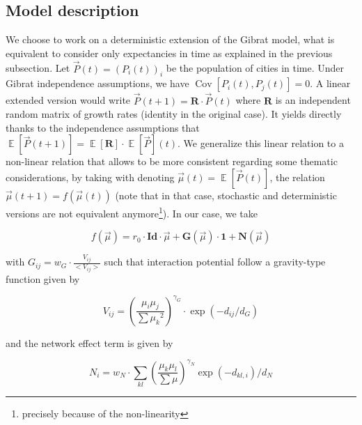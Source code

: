 \documentclass[Royal,sageh,times]{sagej}
\DeclareMathOperator{\Cov}{Cov}
\DeclareMathOperator{\E}{\mathbb{E}}
\newcommand{\Covb}[2]{\ensuremath{\Cov\!\left[#1,#2\right]}}
\newcommand{\Eb}[1]{\ensuremath{\E\!\left[#1\right]}}
\begin{document}
\subsection*{Model description}

We choose to work on a deterministic extension of the Gibrat model, what is equivalent to consider only expectancies in time as explained in the previous subsection. Let $\vec{P}(t)=(P_i(t))_i$ be the population of cities in time. Under Gibrat independence assumptions, we have $\Covb{P_i(t)}{P_j(t)}=0$. A linear extended version would write $\vec{P}(t+1)=\mathbf{R}\cdot \vec{P}(t)$ where $\mathbf{R}$ is an independent random matrix of growth rates (identity in the original case). It yields directly thanks to the independence assumptions that $\Eb{\vec{P}(t+1)}=\Eb{\mathbf{R}}\cdot\Eb{\vec{P}}(t)$. We generalize this linear relation to a non-linear relation that allows to be more consistent regarding some thematic considerations, by taking with denoting $\vec{\mu}(t)=\Eb{\vec{P}(t)}$, the relation $\vec{\mu}(t+1)=f(\vec{\mu}(t))$ (note that in that case, stochastic and deterministic versions are not equivalent anymore\footnote{precisely because of the non-linearity %
}). 
In our case, we take

\begin{equation}
f(\vec{\mu}) = r_0\cdot \mathbf{Id}\cdot \vec{\mu} + \mathbf{G}\left(\vec{\mu}\right)\cdot \mathbf{1} + \mathbf{N}\left(\vec{\mu}\right)
\end{equation}


with $G_{ij} = w_G\cdot \frac{V_{ij}}{<V_{ij}>}$ such that interaction potential follow a gravity-type function given by 

\begin{equation}
V_{ij} = \left(\frac{\mu_i\mu_j}{\sum{\mu_k}^2}\right)^{\gamma_G}\cdot \exp{(-d_{ij}/d_G)}
\end{equation}

and the network effect term is given by


\begin{equation}
N_{i} = w_N \cdot \sum_{kl} \left(\frac{\mu_k\mu_l}{\sum\mu}\right)^{\gamma_N}\exp{(-d_{kl,i})/d_N}
\end{equation}
\end{document}

